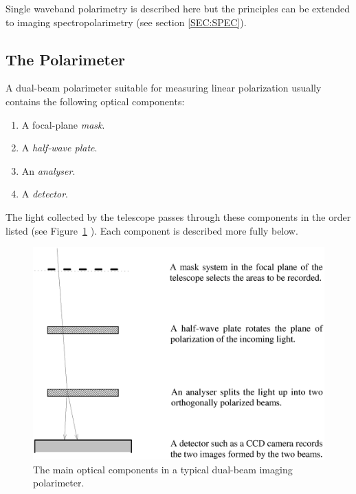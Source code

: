 \documentclass[twoside,11pt]{article}
\newcommand{\hyperref}[4]{#2\ref{#4}#3}
\newenvironment{latexonly}{}{}
\newcommand{\latex}[1]{#1}
\newcommand{\html}[1]{}
\renewcommand{\_}{\texttt{\symbol{95}}}
\begin{document}
Single waveband polarimetry is described here but the principles can be
extended to imaging spectropolarimetry (see \hyperref{here}{section }{}{SEC:SPEC}).

\subsection{The Polarimeter}
A dual-beam polarimeter suitable for measuring linear polarization usually 
contains the following optical components:

\begin{enumerate}
\item A focal-plane \emph{mask}.
\item A \emph{half-wave plate}.
\item An \emph{analyser}.
\item A \emph{detector}.
\end{enumerate}

The light collected by the telescope passes through these components in
the order listed (see \latex{Figure~\ref{fig:optical}} \html{the next figure}
). Each component is described more fully below.

\begin{latexonly}
  \vspace{2mm}
  \begin{figure}[htb]
  \begin{center}
  \includegraphics[clip,scale=0.5]{sun223_figures/optical.eps}
  \caption{The main optical components in a typical dual-beam imaging polarimeter.}
  \label{fig:optical}
  \end{center}
  \end{figure}
\end{latexonly}
\end{document}
